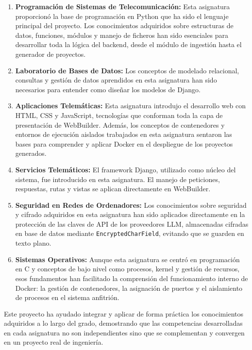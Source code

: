 \begin{enumerate}
  \item \textbf{Programación de Sistemas de Telecomunicación:} Esta asignatura proporcionó la base de programación en Python que ha sido el lenguaje principal del proyecto. Los conocimientos adquiridos sobre estructuras de datos, funciones, módulos y manejo de ficheros han sido esenciales para desarrollar toda la lógica del backend, desde el módulo de ingestión hasta el generador de proyectos.
  
  \item \textbf{Laboratorio de Bases de Datos:} Los conceptos de modelado relacional, consultas y gestión de datos aprendidos en esta asignatura han sido necesarios para entender como diseñar los modelos de Django.
  
  \item \textbf{Aplicaciones Telemáticas:} Esta asignatura introdujo el desarrollo web con HTML, CSS y JavaScript, tecnologías que conforman toda la capa de presentación de WebBuilder. Además, los conceptos de contenedores y entornos de ejecución aislados trabajados en esta asignatura sentaron las bases para comprender y aplicar Docker en el despliegue de los proyectos generados.
  
  \item \textbf{Servicios Telemáticos:} El framework Django, utilizado como núcleo del sistema, fue introducido en esta asignatura. El manejo de peticiones, respuestas, rutas y vistas se aplican directamente en WebBuilder.
  
  \item \textbf{Seguridad en Redes de Ordenadores:} Los conocimientos sobre seguridad y cifrado adquiridos en esta asignatura han sido aplicados directamente en la protección de las claves de API de los proveedores LLM, almacenadas cifradas en base de datos mediante \texttt{EncryptedCharField}, evitando que se guarden en texto plano.
  
  \item \textbf{Sistemas Operativos:} Aunque esta asignatura se centró en programación en C y conceptos de bajo nivel como procesos, kernel y gestión de recursos, esos fundamentos han facilitado la comprensión del funcionamiento interno de Docker: la gestión de contenedores, la asignación de puertos y el aislamiento de procesos en el sistema anfitrión.
\end{enumerate}

Este proyecto ha ayudado integrar y aplicar de forma práctica los conocimientos adquiridos a lo largo del grado, demostrando que las competencias desarrolladas en cada asignatura no son independientes sino que se complementan y convergen en un proyecto real de ingeniería.

